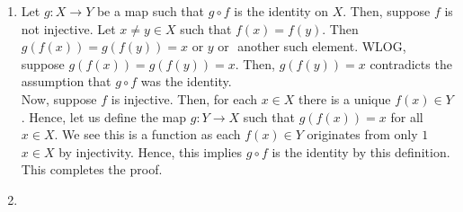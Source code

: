 \documentclass[a4paper]{article}
\begin{document}
\begin{solution}
	\begin{enumerate}
		\item Let \(g: X \to Y\) be a map such that \(g \circ f\) is the identity on \(X\). Then, suppose \(f\) is not injective. Let \(x \neq y \in X\) such that \(f\left( x \right)  = f\left( y \right) \). Then \(g\left( f\left( x \right)  \right) = g\left( f\left( y \right)  \right) = x \text{ or } y \text{ or }\) another such element. WLOG, suppose \(g\left( f\left( x \right)  \right) = g\left( f\left( y \right)  \right) = x \). Then, \(g\left( f\left( y \right)  \right) =x\) contradicts the assumption that \(g \circ f\) was the identity. \\
			Now, suppose \(f\) is injective. Then, for each \(x \in X\) there is a unique \(f\left( x \right) \in Y\). Hence, let us define the map \(g: Y \to X\) such that \(g\left( f\left( x \right)  \right) = x\) for all \(x \in X\). We see this is a function as each \(f\left( x \right) \in Y \) originates from only \(1\) \(x \in X\) by injectivity. Hence, this implies \(g \circ f\) is the identity by this definition. This completes the proof.
			\item
	\end{enumerate}
\end{solution}
\end{document}
